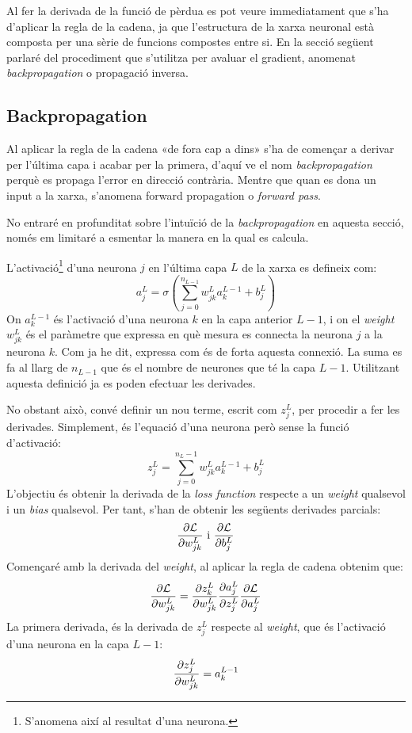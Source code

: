 Al fer la derivada de la funció de pèrdua es pot veure immediatament que s'ha d'aplicar la regla de la cadena, ja que l'estructura de la xarxa neuronal està composta per una sèrie de funcions compostes entre si. En la secció següent parlaré del procediment que s'utilitza per avaluar el gradient, anomenat \textit{backpropagation} o propagació inversa.

\subsection{Backpropagation}
Al aplicar la regla de la cadena «de fora cap a dins» s'ha de començar a derivar per l'última capa i acabar per la primera, d'aquí ve el nom \textit{backpropagation} perquè es propaga l'error en direcció contrària. Mentre que quan es dona un input a la xarxa, s'anomena {forward propagation} o \textit{forward pass}.

No entraré en profunditat sobre l'intuïció de la \textit{backpropagation} en aquesta secció, només em limitaré a esmentar la manera en la qual es calcula.

L'activació\footnote{S'anomena així al resultat d'una neurona.} d'una neurona $j$ en l'última capa $L$ de la xarxa es defineix com: 
$$
a^{L}_j = \sigma\left(\sum_{j=0}^{n_{L- 1}}w^L_{jk} a^{L-1}_k+ b_j^L\right)
$$
On $a^{L-1}_k$ és l'activació d'una neurona $k$ en la capa anterior $L-1$, i on el \textit{weight} $w^L_{jk}$ és el paràmetre que expressa en què mesura es connecta la neurona $j$ a la neurona $k$. Com ja he dit, expressa com és de forta aquesta connexió. La suma es fa al llarg de $n_{L-1}$ que és el nombre de neurones que té la capa $L-1$. Utilitzant aquesta definició ja es poden efectuar les derivades.

No obstant això, convé definir un nou terme, escrit com $z_j^L$, per procedir a fer les derivades. Simplement, és l'equació d'una neurona però sense la funció d'activació:
\begin{equation}
\label{eq:neuron_definition}
	z_j^L = \sum_{j=0}^{n_L - 1}w^L_{jk} a^{L-1}_k+ b_j^L
\end{equation}
L'objectiu és obtenir la derivada de la \textit{loss function} respecte a un \textit{weight} qualsevol i un \textit{bias} qualsevol. Per tant, s'han de obtenir les següents derivades parcials:
$$
\pdv{\mathcal{L}}{w_{jk}^L} \text{ i } \pdv{\mathcal{L}}{b_j^L}
$$
Començaré amb la derivada del \textit{weight}, al aplicar la regla de cadena obtenim que:
\begin{equation}
	\pdv{\mathcal{L}}{w_{jk}^L} = \pdv{z_k^L}{w_{jk}^L}\pdv{a_j^L}{z_j^L}\pdv{\mathcal{L}}{a_j^L}
	\label{eq:chain_neuron}
\end{equation}
La primera derivada, és la derivada de $z_j^L$ respecte al \textit{weight}, que és l'activació d'una neurona en la capa $L-1$:
\begin{equation*}
	\pdv{z_j^L}{w_{jk}^L} = a^{L-1}_k
\end{equation*}

